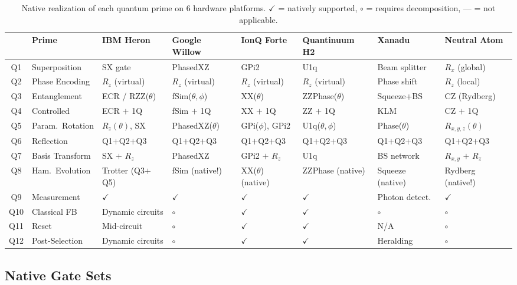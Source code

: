 \documentclass[11pt]{article}
\begin{document}
\begin{table}[t]
\centering
\caption{Native realization of each quantum prime on 6 hardware platforms. $\checkmark$ = natively supported, $\circ$ = requires decomposition, --- = not applicable.}
\label{tab:hardware}
\footnotesize
\begin{tabular}{clllllll}
\toprule
& Prime & IBM Heron & Google Willow & IonQ Forte & Quantinuum H2 & Xanadu & Neutral Atom \\
\midrule
Q1 & Superposition & SX gate & PhasedXZ & GPi2 & U1q & Beam splitter & $R_x$ (global) \\
Q2 & Phase Encoding & $R_z$ (virtual) & $R_z$ (virtual) & $R_z$ (virtual) & $R_z$ (virtual) & Phase shift & $R_z$ (local) \\
Q3 & Entanglement & ECR / RZZ($\theta$) & fSim($\theta,\phi$) & XX($\theta$) & ZZPhase($\theta$) & Squeeze+BS & CZ (Rydberg) \\
Q4 & Controlled & ECR $+$ 1Q & fSim $+$ 1Q & XX $+$ 1Q & ZZ $+$ 1Q & KLM & CZ $+$ 1Q \\
Q5 & Param.\ Rotation & $R_z(\theta)$, SX & PhasedXZ($\theta$) & GPi($\phi$), GPi2 & U1q($\theta,\phi$) & Phase($\theta$) & $R_{x,y,z}(\theta)$ \\
Q6 & Reflection & Q1$+$Q2$+$Q3 & Q1$+$Q2$+$Q3 & Q1$+$Q2$+$Q3 & Q1$+$Q2$+$Q3 & Q1$+$Q2$+$Q3 & Q1$+$Q2$+$Q3 \\
Q7 & Basis Transform & SX $+$ $R_z$ & PhasedXZ & GPi2 $+$ $R_z$ & U1q & BS network & $R_{x,y}$ $+$ $R_z$ \\
Q8 & Ham.\ Evolution & Trotter (Q3$+$Q5) & fSim (native!) & XX($\theta$) (native) & ZZPhase (native) & Squeeze (native) & Rydberg (native!) \\
\midrule
Q9 & Measurement & $\checkmark$ & $\checkmark$ & $\checkmark$ & $\checkmark$ & Photon detect. & $\checkmark$ \\
Q10 & Classical FB & Dynamic circuits & $\circ$ & $\checkmark$ & $\checkmark$ & $\circ$ & $\circ$ \\
Q11 & Reset & Mid-circuit & $\circ$ & $\checkmark$ & $\checkmark$ & N/A & $\circ$ \\
Q12 & Post-Selection & Dynamic circuits & $\circ$ & $\checkmark$ & $\checkmark$ & Heralding & $\circ$ \\
\bottomrule
\end{tabular}
\end{table}

\subsection{Native Gate Sets}
\end{document}

